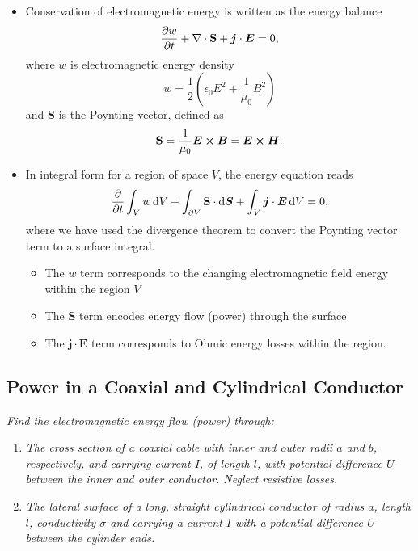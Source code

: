 \documentclass[11pt, a4paper]{article}
\newcommand{\diff}{\mathop{}\!\mathrm{d}} %
\renewcommand{\vec}[1]{\bm{#1}} %
\newcommand{\E}{\vec{E}}  %
\newcommand{\B}{\vec{B}}  %
\renewcommand{\H}{\vec{H}}  %
\renewcommand{\S}{\mathbf{S}}  %
\newcommand{\ee}{\epsilon_{0}}  %
\newcommand{\mm}{\mu_{0}}  %
\newcommand{\m}{\vec{m}}  %
\newcommand{\Poy}{Poynting\xspace}
\renewcommand{\div}{\nabla \cdot}
\begin{document}
\begin{itemize}
	\item Conservation of electromagnetic energy is written as the energy balance
	\begin{equation*}
		\pdv{w}{t} + \div \S + \vec{j}\cdot \E = 0,
	\end{equation*}
	where $ w $ is electromagnetic energy density
	\begin{equation*}
		w = \frac{1}{2}\left(\ee E^{2} + \frac{1}{\mm}B^{2}\right)
	\end{equation*}
	and $ \S $ is the \Poy vector, defined as
	\begin{equation*}
		\S = \frac{1}{\mm}\E \cross \B = \E \cross \H.
	\end{equation*}
	
	\item In integral form for a region of space $ V $, the energy equation reads
	\begin{equation*}
		\pdv{t}\int_{V}w \diff V + \int_{\partial V} \S \cdot  \diff \vec{S} + \int_{V} \vec{j}\cdot \E \diff V = 0,
	\end{equation*}
	where we have used the divergence theorem to convert the Poynting vector term to a surface integral.
	\begin{itemize}
		\item The $ w $ term corresponds to the changing electromagnetic field energy within the region $ V $
		
		\item The $ \S $ term encodes energy flow (power) through the surface
		
		\item The $ \vec{j} \cdot \E $ term corresponds to Ohmic energy losses within the region.
	\end{itemize}
	
\end{itemize}

\subsection{Power in a Coaxial and Cylindrical Conductor}
\textit{Find the electromagnetic energy flow (power) through:}
\begin{enumerate}
	\item \textit{The cross section of a coaxial cable with inner and outer radii $ a $ and $ b $, respectively, and carrying current $ I $, of length $ l $, with potential difference $ U $ between the inner and outer conductor. Neglect resistive losses.}
	
	\item \textit{The lateral surface of a long, straight cylindrical conductor of radius $ a $, length $ l $, conductivity $ \sigma $ and carrying a current $ I $ with a potential difference $ U $ between the cylinder ends.}
\end{enumerate}
\end{document}
